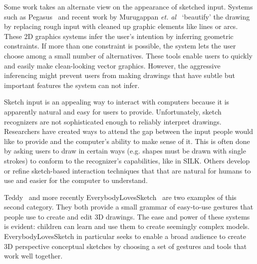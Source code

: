 \documentclass{article}
\begin{document}


Some work takes an alternate view on the appearance of sketched
input. Systems such as Pegasus~\cite{igarashi-pegasus} and recent work
by Murugappan \textit{et. al}~\cite{murugappan-beautification}
`beautify' the drawing by replacing rough input with cleaned up
graphic elements like lines or arcs. These 2D graphics systems infer
the user's intention by inferring geometric constraints. If more than
one constraint is possible, the system lets the user choose among a
small number of alternatives. These tools enable users to quickly and
easily make clean-looking vector graphics. However, the aggressive
inferencing might prevent users from making drawings that have subtle
but important features the system can not infer.


Sketch input is an appealing way to interact with computers because it
is apparently natural and easy for users to provide. Unfortunately,
sketch recognizers are not sophisticated enough to reliably interpret
drawings. Researchers have created ways to attend the gap between the
input people would like to provide and the computer's ability to make
sense of it. This is often done by asking users to draw in certain
ways (e.g. shapes must be drawn with single strokes) to conform to the
recognizer's capabilities, like in SILK. Others develop or refine
sketch-based interaction techniques that that are natural for humans
to use and easier for the computer to understand.

Teddy~\cite{igarashi-teddy} and more recently
EverybodyLovesSketch~\cite{bae-everybody} are two examples of this
second category. They both provide a small grammar of easy-to-use
gestures that people use to create and edit 3D drawings. The ease and
power of these systems is evident: children can learn and use them to
create seemingly complex models. EverybodyLovesSketch in particular
seeks to enable a broad audience to create 3D perspective conceptual
sketches by choosing a set of gestures and tools that work well
together.
\end{document}
